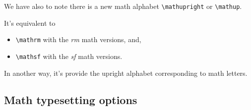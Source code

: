 \documentclass[a4paper,11pt]{christophe}
\begin{document}
\begin{center}
\end{center}

We have also to note there is a new math alphabet \verb=\mathupright= or \verb=\mathup=. 

It's equivalent to 
\begin{itemize}
	\item \verb=\mathrm= with the \textit{rm} math versions, and,
	\item \verb=\mathsf= with the \textit{sf} math versions.
\end{itemize}

 In another way, it's provide the upright alphabet corresponding to math letters.

\subsection{Math typesetting options}
\end{document}
